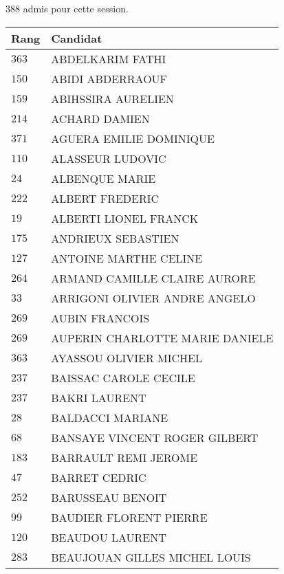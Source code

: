 



  $388$ admis pour cette session.

  \begin{xltabular}{\linewidth}{|l|X|}
    \hline
    \textbf{Rang} & \textbf{Candidat} \\
    \hline
    $363$ & ABDELKARIM FATHI \\
    \hline
    $150$ & ABIDI ABDERRAOUF \\
    \hline
    $159$ & ABIHSSIRA AURELIEN \\
    \hline
    $214$ & ACHARD DAMIEN \\
    \hline
    $371$ & AGUERA EMILIE DOMINIQUE \\
    \hline
    $110$ & ALASSEUR LUDOVIC \\
    \hline
    $24$ & ALBENQUE MARIE \\
    \hline
    $222$ & ALBERT FREDERIC \\
    \hline
    $19$ & ALBERTI LIONEL FRANCK \\
    \hline
    $175$ & ANDRIEUX SEBASTIEN \\
    \hline
    $127$ & ANTOINE MARTHE CELINE \\
    \hline
    $264$ & ARMAND CAMILLE CLAIRE AURORE \\
    \hline
    $33$ & ARRIGONI OLIVIER ANDRE ANGELO \\
    \hline
    $269$ & AUBIN FRANCOIS \\
    \hline
    $269$ & AUPERIN CHARLOTTE MARIE DANIELE \\
    \hline
    $363$ & AYASSOU OLIVIER MICHEL \\
    \hline
    $237$ & BAISSAC CAROLE CECILE \\
    \hline
    $237$ & BAKRI LAURENT \\
    \hline
    $28$ & BALDACCI MARIANE \\
    \hline
    $68$ & BANSAYE VINCENT ROGER GILBERT \\
    \hline
    $183$ & BARRAULT REMI JEROME \\
    \hline
    $47$ & BARRET CEDRIC \\
    \hline
    $252$ & BARUSSEAU BENOIT \\
    \hline
    $99$ & BAUDIER FLORENT PIERRE \\
    \hline
    $120$ & BEAUDOU LAURENT \\
    \hline
    $283$ & BEAUJOUAN GILLES MICHEL LOUIS \\

\end{xltabular}
